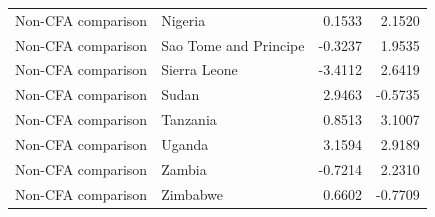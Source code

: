 \begin{table}
\begin{tabular}[t]{llrr}
Non-CFA comparison & Nigeria & 0.1533 & 2.1520\\
Non-CFA comparison & Sao Tome and Principe & -0.3237 & 1.9535\\
Non-CFA comparison & Sierra Leone & -3.4112 & 2.6419\\
\addlinespace
Non-CFA comparison & Sudan & 2.9463 & -0.5735\\
Non-CFA comparison & Tanzania & 0.8513 & 3.1007\\
Non-CFA comparison & Uganda & 3.1594 & 2.9189\\
Non-CFA comparison & Zambia & -0.7214 & 2.2310\\
Non-CFA comparison & Zimbabwe & 0.6602 & -0.7709\\
\bottomrule
\end{tabular}
\end{table}